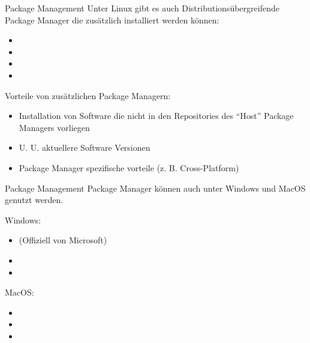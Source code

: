 \documentclass{setbeamer}
\begin{document}
\begin{frame}{Package Management}
    Unter Linux gibt es auch Distributionsübergreifende Package Manager die zusätzlich installiert werden können:
    \begin{itemize}
        \item {}
        \item {}
        \item {}
        \item {}
    \end{itemize}

    \vspace{0.3cm}

    Vorteile von zusätzlichen Package Managern:
    \begin{itemize}
        \item Installation von Software die nicht in den Repositories des ``Host'' Package Managers vorliegen
        \item U. U. aktuellere Software Versionen
        \item Package Manager spezifische vorteile (z. B. Cross-Platform)
    \end{itemize}
\end{frame}

\begin{frame}{Package Management}
    Package Manager können auch unter Windows und MacOS genutzt werden.

    \vspace{0.3cm}

    Windows:
    \begin{itemize}
        \item {} (Offiziell von Microsoft)
        \item {}
        \item {}
    \end{itemize}

    \vspace{0.3cm}

    MacOS:
    \begin{itemize}
        \item {}
        \item {}
        \item {}
    \end{itemize}
\end{frame}
\end{document}

